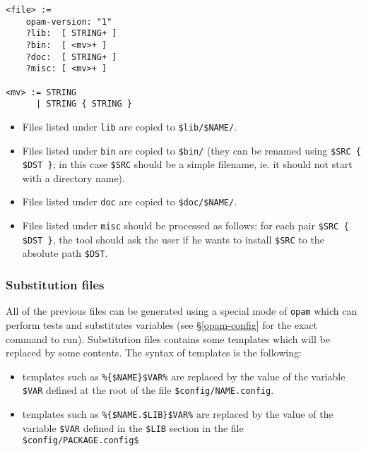 \documentclass[a4paper,11pt]{article}
\begin{document}
{\small
\begin{Verbatim}[frame=single]
<file> :=
    opam-version: "1"
    ?lib:  [ STRING+ ]
    ?bin:  [ <mv>+ ]
    ?doc:  [ STRING+ ]
    ?misc: [ <mv>+ ]

<mv> := STRING
      | STRING { STRING }
\end{Verbatim}
}

\begin{itemize}
\item Files listed under {\tt lib} are copied to \verb+$lib/$NAME/+.
\item Files listed under {\tt bin} are copied to \verb+$bin/+ (they
  can be renamed using \verb+$SRC { $DST }+; in this case \verb+$SRC+
  should be a simple filename, ie. it should not start with a
  directory name).
\item Files listed under {\tt doc} are copied to \verb+$doc/$NAME/+.
\item Files listed under {\tt misc} should be processed as follows:
  for each pair \verb+$SRC { $DST }+, the tool should ask the user if
  he wants to install \verb+$SRC+ to the absolute path \verb+$DST+.
\end{itemize}

\subsubsection{Substitution files}
\label{subst}

All of the previous files can be generated using a special mode of
{\tt opam} which can perform tests and substitutes variables (see
\S\ref{opam-config} for the exact command to run). Substitution files
contains some templates which will be replaced by some contents. The
syntax of templates is the following:

\begin{itemize}

\item templates such as \verb+%{$NAME}$VAR%+ are replaced by the value
  of the variable \verb+$VAR+ defined at the root of the file
  \verb+$config/NAME.config+.

\item templates such as \verb+%{$NAME.$LIB}$VAR%+ are replaced by the
  value of the variable \verb+$VAR+ defined in the \verb+$LIB+ section
  in the file \verb+$config/PACKAGE.config$+


\end{itemize}
\end{document}
